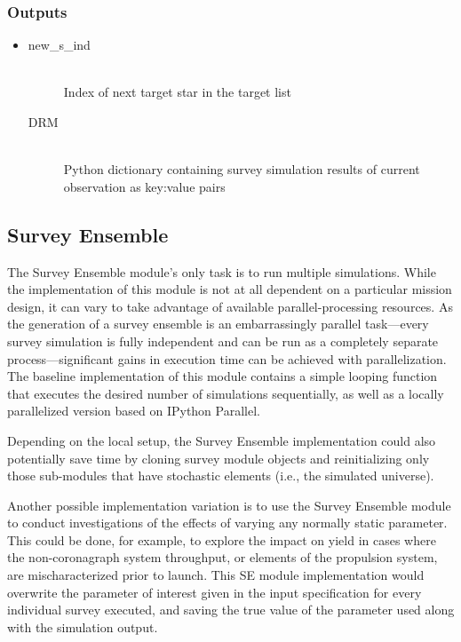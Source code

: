 \documentclass[cleanfoot]{asme2ej}
\begin{document}
\subsubsection*{Outputs}
\begin{itemize}
    \item 
    \begin{description}
        \item[new\_s\_ind] \hfill \\
        Index of next target star in the target list
        \item[DRM] \hfill \\
        Python dictionary containing survey simulation results of current observation as key:value pairs
    \end{description}
\end{itemize}


\subsection{Survey Ensemble}
The Survey Ensemble module's only task is to run multiple simulations.  While the implementation of this module is not at all dependent on a particular mission design, it can vary to take advantage of available parallel-processing resources.  As the generation of a survey ensemble is an embarrassingly parallel task---every survey simulation is fully independent and can be run as a completely separate process---significant gains in execution time can be achieved with parallelization.  The baseline implementation of this module contains a simple looping function that executes the desired number of simulations sequentially, as well as a locally parallelized version based on IPython Parallel.

Depending on the local setup, the Survey Ensemble implementation could also potentially save time by cloning survey module objects and reinitializing only those sub-modules that have stochastic elements (i.e., the simulated universe).

Another possible implementation variation is to use the Survey Ensemble module to conduct investigations of the effects of varying any normally static parameter.  This could be done, for example, to explore the impact on yield in cases where the non-coronagraph system throughput, or elements of the propulsion system, are mischaracterized prior to launch.  This SE module implementation would overwrite the parameter of interest given in the input specification for every individual survey executed, and saving the true value of the parameter used along with the simulation output.
\end{document}
